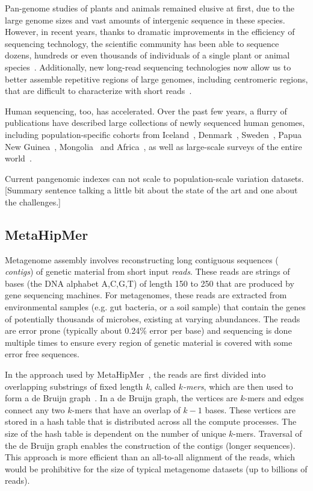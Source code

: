 Pan-genome studies of plants and animals remained elusive at first, due to the large genome sizes and vast amounts of intergenic sequence in these species. However, in recent years, thanks to dramatic improvements in the efficiency of sequencing technology, the scientific community has been able to sequence dozens, hundreds or even thousands of individuals of a single plant or animal species~\cite{XXX}. Additionally, new long-read sequencing technologies now allow us to better assemble repetitive regions of large genomes, including centromeric regions, that are difficult to characterize with short reads~\cite{XXX}.

Human sequencing, too, has accelerated. Over the past few years, a flurry of publications have described large collections of newly sequenced human genomes, including population-specific cohorts from Iceland~\cite{XXX}, Denmark~\cite{XXX}, Sweden~\cite{XXX}, Papua New Guinea~\cite{XXX}, Mongolia~\cite{XXX} and Africa~\cite{XXX}, as well as large-scale surveys of the entire world~\cite{XXX}. 



\begin{rproblem}
Current pangenomic indexes can not scale to population-scale variation datasets.
[Summary sentence talking a little bit about the state of the art and one about the challenges.]
\label{rprob:peppermint}
\end{rproblem}

\subsection{MetaHipMer}

Metagenome assembly involves reconstructing long contiguous sequences ({\it
contigs}) of genetic material from short input {\it reads}. These reads are
strings of bases (the DNA alphabet A,C,G,T) of length 150 to 250 that are
produced by gene sequencing machines.  For metagenomes, these reads are
extracted from environmental samples (e.g. gut bacteria, or a soil sample) that
contain the genes of potentially thousands of microbes, existing at varying
abundances.  The reads are error prone (typically about 0.24\% error per base)
and sequencing is done multiple times to ensure every region of genetic material
is covered with some error free sequences.

In the approach used by MetaHipMer~\cite{GeorganasEHG18,HofmeyrEGC20}, the reads are first divided into overlapping
substrings of fixed length {\it k}, called {\it $k$-mers}, which are then used
to form a de Bruijn graph~\cite{CompeauPeTe11}. In a de Bruijn graph, the
vertices are $k$-mers and edges connect any two $k$-mers that have an overlap of
$k-1$ bases. These vertices are stored in a hash table that is distributed
across all the compute processes.  The size of the hash table is dependent on
the number of unique $k$-mers.  Traversal of the de Bruijn graph enables the
construction of the contigs (longer sequences).  This approach is more efficient
than an all-to-all alignment of the reads, which would be prohibitive for the
size of typical metagenome datasets (up to billions of reads).

